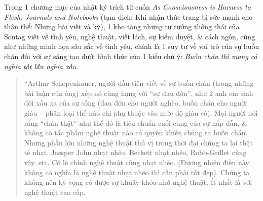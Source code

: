 \documentclass{article}
\begin{document}
\begin{enumerate}
	Trong 1 chương mục của nhật ký trích từ cuốn {\it As Consciousness is Harness to Flesh: Journals and Notebooks} (tạm dịch: Khi nhận thức trang bị sức mạnh cho thân thể: Những bài viết và ký), 1 kho tàng những tư tưởng thông thái của {\sc Sontag} viết về tình yêu, nghệ thuật, viết lách, sự kiểm duyệt, \& cách ngôn, cũng như những minh họa sâu sắc về tình yêu, chính là 1 suy tư về vai trò của sự buồn chán đối với sự sáng tạo dưới hình thức của 1 kiểu chú ý: {\it Buồn chán thì mang cả nghĩa tốt lẫn nghĩa xấu.}
	\begin{quote}
		``{\sc Arthur Schopenhauer}, người đầu tiên viết về sự buồn chán (trong những bài luận của ông) xếp nó cùng hạng với ``sự đau đớn'', như 2 anh em sinh đôi xấu xa của sự sống (đau đớn cho người nghèo, buồn chán cho người giàu -- phân loại thế nào chỉ phụ thuộc vào mức độ giàu có). Mọi người nói rằng ``chán thật'' như thể đó là tiêu chuẩn cuối cùng của sự hấp dẫn, \& không có tác phẩm nghệ thuật nào có quyền khiến chúng ta buồn chán. Nhưng phần lớn những nghệ thuật thú vị trong thời đại chúng ta lại thật tẻ nhạt. {\sc Jassper John} nhạt nhẽo. {\sc Beckett} nhạt nhẽo, {\sc Robb-Grillet} cũng vậy. etc. Có lẽ chính nghệ thuật cũng nhạt nhẽo. (Đương nhiên điều này không có nghĩa là nghệ thuật nhạt nhẽo thì cần phải tốt đẹp). Chúng ta không nên kỳ vọng có được sự khuây khỏa nhờ nghệ thuật. Ít nhất là với nghệ thuật cao cấp.
		

\end{quote}
\end{enumerate}
\end{document}
